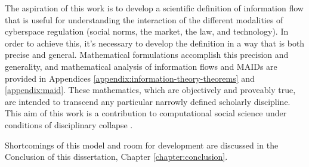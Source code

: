 \documentclass[../thesis.tex]{subfiles}
\begin{document}
 The aspiration of this work is to develop a scientific definition
 of information flow that is useful for understanding the
 interaction of the different modalities of cyberspace regulation
 (social norms, the market, the law, and technology).
 In order to achieve this, it's necessary to develop the definition
 in a way that is both precise and general.
 Mathematical formulations accomplish this precision and generality,
 and mathematical analysis of information flows and MAIDs are
 provided in Appendices \ref{appendix:information-theory-theorems}
 and \ref{appendix:maid}.
 These mathematics, which are objectively and proveably true,
 are intended to transcend any particular
 narrowly defined scholarly discipline.
 This aim of this work is a contribution to computational social
 science \citep{benthall2016philosophy} under conditions of
 disciplinary collapse \citep{benthall2015designing}.

 Shortcomings of this model and room for development
 are discussed in the Conclusion of this
 dissertation, Chapter \ref{chapter:conclusion}.
 
 
\end{document}
